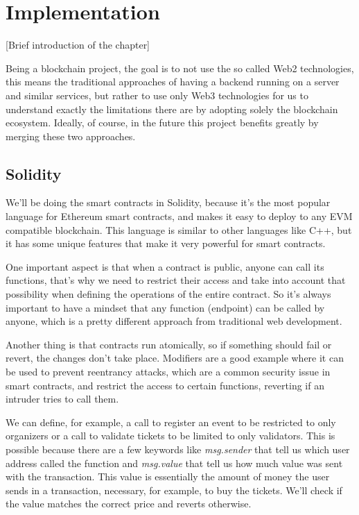 \chapter{Implementation}
\label{ch:implementation}

[Brief introduction of the chapter]

Being a blockchain project, the goal is to not use the so called Web2 technologies, this means the traditional approaches of having a backend running on a server and similar services, but rather to use only Web3 technologies for us to understand exactly the limitations there are by adopting solely the blockchain ecosystem. Ideally, of course, in the future this project benefits greatly by merging these two approaches.

\section{Solidity}
\label{sec:solidity}

We'll be doing the smart contracts in Solidity, because it's the most popular language for Ethereum smart contracts, and makes it easy to deploy to any EVM compatible blockchain. This language is similar to other languages like C++, but it has some unique features that make it very powerful for smart contracts.

One important aspect is that when a contract is public, anyone can call its functions, that's why we need to restrict their access and take into account that possibility when defining the operations of the entire contract. So it's always important to have a mindset that any function (endpoint) can be called by anyone, which is a pretty different approach from traditional web development.

Another thing is that contracts run atomically, so if something should fail or revert, the changes don't take place. Modifiers are a good example where it can be used to prevent reentrancy attacks, which are a common security issue in smart contracts, and restrict the access to certain functions, reverting if an intruder tries to call them.

We can define, for example, a call to register an event to be restricted to only organizers or a call to validate tickets to be limited to only validators. This is possible because there are a few keywords like \textit{msg.sender} that tell us which user address called the function and \textit{msg.value} that tell us how much value was sent with the transaction. This value is essentially the amount of money the user sends in a transaction, necessary, for example, to buy the tickets. We'll check if the value matches the correct price and reverts otherwise.

